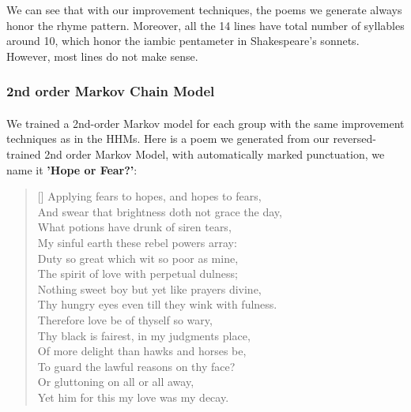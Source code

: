 We can see that with our improvement techniques, the poems we generate always honor the rhyme pattern. Moreover, all the 14 lines have total number of syllables around 10, which honor the iambic pentameter in Shakespeare's sonnets. However, most lines do not make sense.

\subsubsection{2nd order Markov Chain Model}
\paragraph{}
We trained a 2nd-order Markov model for each group with the same improvement techniques as in the HHMs. Here is a poem we generated from our reversed-trained 2nd order Markov Model, with automatically marked punctuation, we name it \textbf{'Hope or Fear?'}:
\renewcommand{\poemtoc}{subsection}
\settowidth{\versewidth}{Thy proud hearts slave and vassal wretch to be?}
\begin{verse}[\versewidth]
Applying fears to hopes, and hopes to fears,\\
And swear that brightness doth not grace the day,\\
What potions have drunk of siren tears,\\
My sinful earth these rebel powers array:\\
\vspace{5pt}
Duty so great which wit so poor as mine,\\
The spirit of love with perpetual dulness;\\
Nothing sweet boy but yet like prayers divine,\\
Thy hungry eyes even till they wink with fulness.\\
\vspace{5pt}
Therefore love be of thyself so wary,\\
Thy black is fairest, in my judgments place,\\
Of more delight than hawks and horses be,\\
To guard the lawful reasons on thy face?\\
\vspace{5pt}
\vin  Or gluttoning on all or all away,\\
\vin  Yet him for this my love was my decay.\\
\end{verse}

